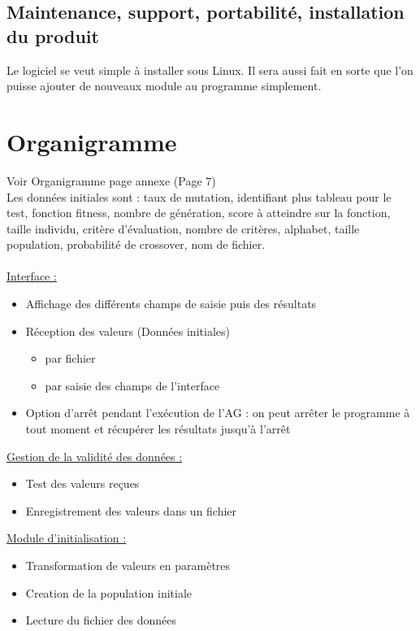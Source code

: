 \documentclass[a4paper,11pt]{article}
\begin{document}
		\subsection{Maintenance, support, portabilité, installation du produit}
			Le logiciel se veut simple à installer sous Linux. Il sera aussi fait en sorte que l'on puisse ajouter de nouveaux module au programme simplement.  
			
	\section{Organigramme}
		Voir Organigramme page annexe (Page 7)\\
		Les données initiales sont : 	taux de mutation, 
										identifiant plus tableau pour le test, 
										fonction fitness, 
										nombre de génération, 
										score à atteindre sur la fonction, 
										taille individu, 
										critère d’évaluation, 
										nombre de critères, 
										alphabet, 
										taille population, probabilité de crossover, 
										nom de fichier.\\
		\\
		\underline{Interface :}
			\begin{itemize}
			\item Affichage des différents champs de saisie puis des résultats
			\item Réception des valeurs (Données initiales)
				\begin{itemize}
				\item par fichier
				\item par saisie des champs de l'interface
				\end{itemize}
			\item Option d’arrêt pendant l'exécution de l’AG : on peut arrêter le programme à tout moment et récupérer les résultats jusqu’à l’arrêt\\
			\end{itemize}
		
		\underline{Gestion de la validité des données : }
		\begin{itemize}
			\item Test des valeurs reçues
			\item Enregistrement des valeurs dans un fichier\\
		\end{itemize}
		
		\underline{Module d'initialisation : }
		\begin{itemize}
			\item Transformation de valeurs en paramètres
			\item Creation de la population initiale
			\item Lecture du fichier des données\\
		\end{itemize}
	
\end{document}
